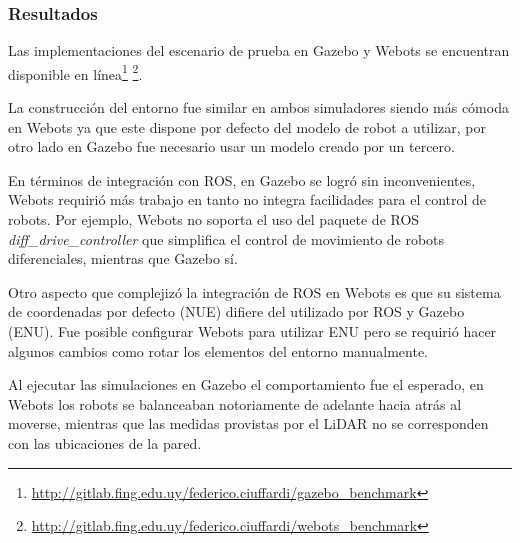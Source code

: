 \subsubsection{Resultados}
Las implementaciones del escenario de prueba en Gazebo y Webots se encuentran
disponible en línea\footnote{\url{http://gitlab.fing.edu.uy/federico.ciuffardi/gazebo_benchmark}}
\footnote{\url{http://gitlab.fing.edu.uy/federico.ciuffardi/webots_benchmark}}. 

La construcción del entorno fue similar en ambos simuladores siendo
más cómoda en Webots ya que este dispone por defecto del modelo de robot a
utilizar, por otro lado en Gazebo fue necesario usar un modelo creado por un
tercero.

En términos de integración con \gls{ROS}, en Gazebo se logró sin inconvenientes,
Webots requirió más trabajo en tanto no integra facilidades para el control de
robots. Por ejemplo, Webots no soporta el uso del paquete de \gls{ROS}
\emph{diff\_drive\_controller} \cite{diff_drive_controller} que simplifica el
control de movimiento de robots diferenciales, mientras que Gazebo sí.

Otro aspecto que complejizó la integración de \gls{ROS} en Webots es que su sistema
de coordenadas por defecto (\gls{NUE}) difiere del utilizado por \gls{ROS} y Gazebo (\gls{ENU}).
Fue posible configurar Webots para utilizar \gls{ENU} pero se requirió hacer algunos
cambios como rotar los elementos del entorno manualmente.

Al ejecutar las simulaciones en Gazebo el comportamiento fue el esperado, en
Webots los robots se balanceaban notoriamente de adelante hacia atrás al
moverse, mientras que las medidas provistas por el \gls{LiDAR} no se corresponden con
las ubicaciones de la pared.

